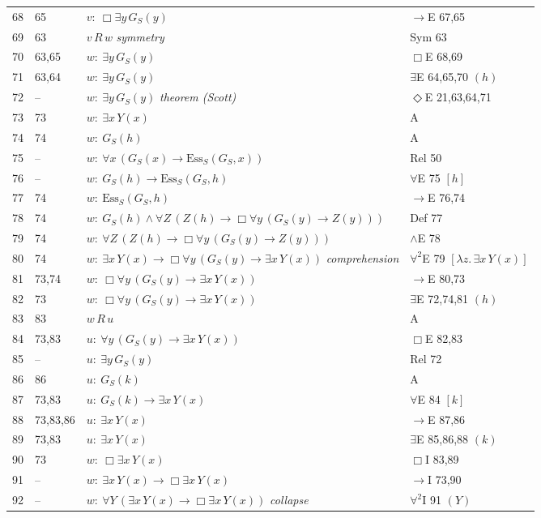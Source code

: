 {\begin{longtable}{@{}r>{\raggedright}p{}p{}>{\raggedright\arraybackslash}p{}@{}}
68 & 65 & $v:\ \Box \exists y\, G_{\!S}(y)$ & $\to$E 67,65\\
69 & 63 & $v\,R\,w$ \hfill{\itshape symmetry} & Sym 63\\
70 & 63,65 & $w:\ \exists y\, G_{\!S}(y)$ & $\Box$E 68,69\\
71 & 63,64 & $w:\ \exists y\, G_{\!S}(y)$ & $\exists$E 64,65,70 $(h)$\\
72 & -- & $w:\ \exists y\, G_{\!S}(y)$ \hfill{\itshape theorem (Scott)} & $\Diamond$E 21,63,64,71\\
73 & 73 & $w:\ \exists x\, Y(x)$ & A\\
74 & 74 & $w:\ G_{\!S}(h)$ & A\\
75 & -- & $w:\ \forall x\, (G_{\!S}(x) \to \mathrm{Ess}_S(G_{\!S},x))$ & Rel 50\\
76 & -- & $w:\ G_{\!S}(h) \to \mathrm{Ess}_S(G_{\!S},h)$ & $\forall$E 75 $[h]$\\
77 & 74 & $w:\ \mathrm{Ess}_S(G_{\!S},h)$ & $\to$E 76,74\\
78 & 74 & $w:\ G_{\!S}(h) \wedge \forall Z\, (Z(h) \to \Box \forall y\, (G_{\!S}(y) \to Z(y)))$ & Def 77\\
79 & 74 & $w:\ \forall Z\, (Z(h) \to \Box \forall y\, (G_{\!S}(y) \to Z(y)))$ & $\wedge$E 78\\
80 & 74 & $w:\ \exists x\, Y(x) \to \Box \forall y\, (G_{\!S}(y) \to \exists x\, Y(x))$ \hfill{\itshape comprehension} & $\forall^2$E 79 $[\lambda z.\,\exists x\, Y(x)]$\\
81 & 73,74 & $w:\ \Box \forall y\, (G_{\!S}(y) \to \exists x\, Y(x))$ & $\to$E 80,73\\
82 & 73 & $w:\ \Box \forall y\, (G_{\!S}(y) \to \exists x\, Y(x))$ & $\exists$E 72,74,81 $(h)$\\
83 & 83 & $w\,R\,u$ & A\\
84 & 73,83 & $u:\ \forall y\, (G_{\!S}(y) \to \exists x\, Y(x))$ & $\Box$E 82,83\\
85 & -- & $u:\ \exists y\, G_{\!S}(y)$ & Rel 72\\
86 & 86 & $u:\ G_{\!S}(k)$ & A\\
87 & 73,83 & $u:\ G_{\!S}(k) \to \exists x\, Y(x)$ & $\forall$E 84 $[k]$\\
88 & 73,83,86 & $u:\ \exists x\, Y(x)$ & $\to$E 87,86\\
89 & 73,83 & $u:\ \exists x\, Y(x)$ & $\exists$E 85,86,88 $(k)$\\
90 & 73 & $w:\ \Box \exists x\, Y(x)$ & $\Box$I 83,89\\
91 & -- & $w:\ \exists x\, Y(x) \to \Box \exists x\, Y(x)$ & $\to$I 73,90\\
92 & -- & $w:\ \forall Y\, (\exists x\, Y(x) \to \Box \exists x\, Y(x))$ \hfill{\itshape collapse} & $\forall^2$I 91 $(Y)$\\
\bottomrule\end{longtable}}
